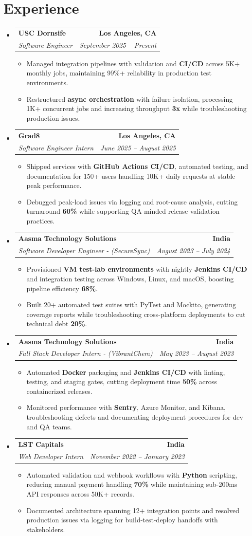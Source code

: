 \documentclass[letterpaper,10pt]{article}
\makeatletter
\newcommand{\resumeItem}[1]{\item\small{{#1 \vspace{-2pt}}}}
\newcommand{\resumeSubheading}[4]{\vspace{-1pt}\item\begin{tabular*}{1.0\textwidth}[t]{l@{\extracolsep{\fill}}r}\textbf{#1} & \textbf{\small #2} \\\textit{\small#3} & \textit{\small #4} \\\end{tabular*}\vspace{-2pt}}
\newcommand{\resumeSubHeadingListStart}{\begin{itemize}[leftmargin=0.0in, label={}]}
\newcommand{\resumeSubHeadingListEnd}{\end{itemize}}
\newcommand{\resumeItemListStart}{\begin{itemize}[leftmargin=0.15in,label=\textbullet,itemsep=2pt,topsep=0pt,parsep=0pt,partopsep=0pt]}
\newcommand{\resumeItemListEnd}{\end{itemize}\vspace{-4pt}}
\makeatother
\begin{document}
\section{Experience}
\resumeSubHeadingListStart
\resumeSubheading{USC Dornsife}{Los Angeles, CA}{Software Engineer}{September 2025 -- Present}
\resumeItemListStart
\resumeItem{Managed integration pipelines with validation and \textbf{CI/CD} across 5K+ monthly jobs, maintaining 99\%+ reliability in production test environments.}
\resumeItem{Restructured \textbf{async orchestration} with failure isolation, processing 1K+ concurrent jobs and increasing throughput \textbf{3x} while troubleshooting production issues.}
\resumeItemListEnd
\resumeSubheading{Grad8}{Los Angeles, CA}{Software Engineer Intern}{June 2025 -- August 2025}
\resumeItemListStart
\resumeItem{Shipped services with \textbf{GitHub Actions CI/CD}, automated testing, and documentation for 150+ users handling 10K+ daily requests at stable peak performance.}
\resumeItem{Debugged peak-load issues via logging and root-cause analysis, cutting turnaround \textbf{60\%} while supporting QA-minded release validation practices.}
\resumeItemListEnd
\resumeSubheading{Aasma Technology Solutions}{India}{Software Developer Engineer - (SecureSync)}{August 2023 -- July 2024}
\resumeItemListStart
\resumeItem{Provisioned \textbf{VM test-lab environments} with nightly \textbf{Jenkins CI/CD} and integration testing across Windows, Linux, and macOS, boosting pipeline efficiency \textbf{68\%}.}
\resumeItem{Built 20+ automated test suites with PyTest and Mockito, generating coverage reports while troubleshooting cross-platform deployments to cut technical debt \textbf{20\%}.}
\resumeItemListEnd
\resumeSubheading{Aasma Technology Solutions}{India}{Full Stack Developer Intern - (VibrantChem)}{May 2023 -- August 2023}
\resumeItemListStart
\resumeItem{Automated \textbf{Docker} packaging and \textbf{Jenkins CI/CD} with linting, testing, and staging gates, cutting deployment time \textbf{50\%} across containerized releases.}
\resumeItem{Monitored performance with \textbf{Sentry}, Azure Monitor, and Kibana, troubleshooting defects and documenting deployment procedures for dev and QA teams.}
\resumeItemListEnd
\resumeSubheading{LST Capitals}{India}{Web Developer Intern}{November 2022 -- January 2023}
\resumeItemListStart
\resumeItem{Automated validation and webhook workflows with \textbf{Python} scripting, reducing manual payment handling \textbf{70\%} while maintaining sub-200ms API responses across 50K+ records.}
\resumeItem{Documented architecture spanning 12+ integration points and resolved production issues via logging for build-test-deploy handoffs with stakeholders.}
\resumeItemListEnd
\resumeSubHeadingListEnd
\vspace{-6pt}
\end{document}
